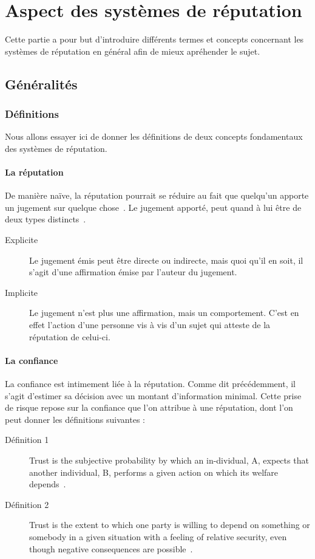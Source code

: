 \documentclass[a4paper, 11pt]{article} %
\begin{document}

\section{Aspect des systèmes de réputation}
Cette partie a pour but d'introduire différents termes et concepts concernant les systèmes de réputation en général afin de mieux apréhender le sujet.

\subsection{Généralités}
\subsubsection{Définitions}
Nous allons essayer ici de donner les définitions de deux concepts fondamentaux des systèmes de réputation.

\paragraph{La réputation}
De manière naïve, la réputation pourrait se réduire au fait que quelqu'un apporte un jugement sur quelque chose~\cite{FarmerGlass2010}.
Le jugement apporté, peut quand à lui être de deux types distincts~\cite{FarmerGlass2010}.
\begin{description}
	\item[Explicite] Le jugement émis peut être directe ou indirecte, mais quoi qu'il en soit, il s'agit d'une affirmation émise par l'auteur du jugement.
	\item[Implicite] Le jugement n'est plus une affirmation, mais un comportement. C'est en effet l'action d'une personne vis à vis d'un sujet qui atteste de la réputation de celui-ci.
\end{description}

\paragraph{La confiance}
La confiance est intimement liée à la réputation. Comme dit précédemment, il s'agit d'estimer sa décision avec un montant d'information minimal.
Cette prise de risque repose sur la confiance que l'on attribue à une réputation, dont l'on peut donner les définitions suivantes :
\begin{description}
	\item[Définition 1] Trust is the subjective probability by which an in-dividual, A, expects that another individual, B, performs a given action on which its welfare depends~\cite{JosangIsmailBoyd2007}.
	\item[Définition 2]Trust is the extent to which one party is willing to depend on something or somebody in a given situation with a feeling of relative security, even though negative consequences are possible~\cite{JosangIsmailBoyd2007}.
\end{description}
\end{document}
